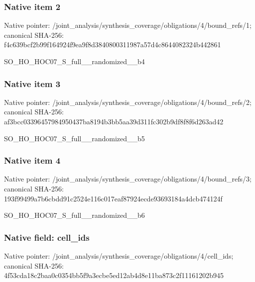 \documentclass[10pt,a4paper]{article}
\begin{document}
\subsubsection{Native item 2}
Native pointer: /joint\_\allowbreak{}analysis/synthesis\_\allowbreak{}coverage/obligations/4/bound\_\allowbreak{}refs/1; canonical SHA-256: f4c639bcf2b99f164924f9ea9f8d3840800311987a57d4c8644082324b442861

\begingroup\raggedright\sloppy SO\_\allowbreak{}HO\_\allowbreak{}HOC07\_\allowbreak{}S\_\allowbreak{}full\_\allowbreak{}\_\allowbreak{}randomized\_\allowbreak{}\_\allowbreak{}b4\par\endgroup

\subsubsection{Native item 3}
Native pointer: /joint\_\allowbreak{}analysis/synthesis\_\allowbreak{}coverage/obligations/4/bound\_\allowbreak{}refs/2; canonical SHA-256: af3bcc03396457984950437ba8194b3bb5aa39d311fc302b9df8f8f6d263ad42

\begingroup\raggedright\sloppy SO\_\allowbreak{}HO\_\allowbreak{}HOC07\_\allowbreak{}S\_\allowbreak{}full\_\allowbreak{}\_\allowbreak{}randomized\_\allowbreak{}\_\allowbreak{}b5\par\endgroup

\subsubsection{Native item 4}
Native pointer: /joint\_\allowbreak{}analysis/synthesis\_\allowbreak{}coverage/obligations/4/bound\_\allowbreak{}refs/3; canonical SHA-256: 193f99499a7b6cbdd91c2524e116c017eaf87924ecde93693184a4dcb474124f

\begingroup\raggedright\sloppy SO\_\allowbreak{}HO\_\allowbreak{}HOC07\_\allowbreak{}S\_\allowbreak{}full\_\allowbreak{}\_\allowbreak{}randomized\_\allowbreak{}\_\allowbreak{}b6\par\endgroup

\subsubsection{Native field: cell\_\allowbreak{}ids}
Native pointer: /joint\_\allowbreak{}analysis/synthesis\_\allowbreak{}coverage/obligations/4/cell\_\allowbreak{}ids; canonical SHA-256: 4f53cda18c2baa0c0354bb5f9a3ecbe5ed12ab4d8e11ba873c2f11161202b945
\end{document}
